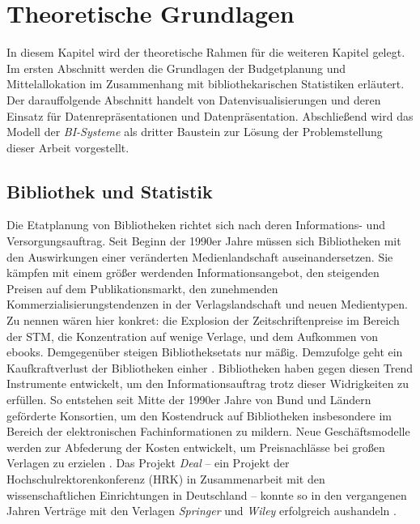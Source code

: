 \chapter{Theoretische Grundlagen}
\label{chap:two}
In diesem Kapitel wird der theoretische Rahmen für die weiteren Kapitel gelegt. Im
ersten Abschnitt werden die Grundlagen der Budgetplanung und Mittelallokation im Zusammenhang mit bibliothekarischen Statistiken erläutert. 
Der darauffolgende Abschnitt handelt von Datenvisualisierungen und deren Einsatz
für Datenrepräsentationen und Datenpräsentation. Abschließend wird das Modell der \textit{\acrlong{BI}-Systeme} als dritter Baustein zur Lösung der 
Problemstellung dieser Arbeit vorgestellt.

\section{Bibliothek und Statistik}
\label{chap:two_one}
Die Etatplanung von Bibliotheken richtet sich nach deren Informations- und Versorgungsauftrag. 
Seit Beginn der 1990er Jahre müssen sich Bibliotheken mit den Auswirkungen einer veränderten Medienlandschaft auseinandersetzen.
Sie kämpfen mit einem größer werdenden Informationsangebot, den steigenden Preisen auf dem Publikationsmarkt, 
den zunehmenden Kommerzialisierungstendenzen in der Verlagslandschaft und neuen Medientypen. 
Zu nennen wären hier konkret: die Explosion der Zeitschriftenpreise im Bereich der \acrfull{STM}, die Konzentration auf wenige Verlage, 
und dem Aufkommen von ebooks. Demgegenüber steigen Bibliotheksetats nur mäßig. 
Demzufolge geht ein Kaufkraftverlust der Bibliotheken einher \cite[vgl.][164 ff.]{moravetz-kuhlmann_monika_erwerbungspolitik_2015}.
Bibliotheken haben gegen diesen Trend Instrumente entwickelt, um den Informationsauftrag trotz dieser Widrigkeiten zu erfüllen.
So entstehen seit Mitte der 1990er Jahre von Bund und Ländern geförderte Konsortien, um den Kostendruck auf Bibliotheken insbesondere im Bereich der elektronischen
Fachinformationen zu mildern. Neue Geschäftsmodelle werden zur Abfederung der Kosten entwickelt, um Preisnachlässe bei großen Verlagen zu erzielen
\cite[vgl.][169 ff.]{moravetz-kuhlmann_monika_erwerbungspolitik_2015}. Das Projekt \textit{Deal} -- ein Projekt der Hochschulrektorenkonferenz (HRK) in Zusammenarbeit mit den
wissenschaftlichen Einrichtungen in Deutschland -- konnte so in den vergangenen Jahren Verträge mit den Verlagen \textit{Springer} und \textit{Wiley} erfolgreich aushandeln \cite[vgl.][]{projekt_deal_projekt_2020}.

